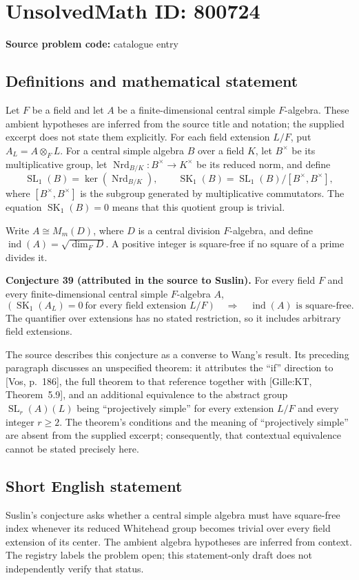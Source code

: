 \documentclass[11pt]{article}
\begin{document}
\section*{UnsolvedMath ID: 800724}
\textbf{Source problem code:} catalogue entry
\subsection{Definitions and mathematical statement}
Let \(F\) be a field and let \(A\) be a finite-dimensional central simple \(F\)-algebra. These ambient hypotheses are inferred from the source title and notation; the supplied excerpt does not state them explicitly. For each field extension \(L/F\), put \(A_L=A\otimes_F L\). For a central simple algebra \(B\) over a field \(K\), let \(B^\times\) be its multiplicative group, let \(\operatorname{Nrd}_{B/K}:B^\times\to K^\times\) be its reduced norm, and define
\[
\operatorname{SL}_1(B)=\ker(\operatorname{Nrd}_{B/K}),\qquad
\operatorname{SK}_1(B)=\operatorname{SL}_1(B)/[B^\times,B^\times],
\]
where \([B^\times,B^\times]\) is the subgroup generated by multiplicative commutators. The equation \(\operatorname{SK}_1(B)=0\) means that this quotient group is trivial.

Write \(A\cong M_m(D)\), where \(D\) is a central division \(F\)-algebra, and define \(\operatorname{ind}(A)=\sqrt{\dim_F D}\). A positive integer is square-free if no square of a prime divides it.

\textbf{Conjecture 39 (attributed in the source to Suslin).} For every field \(F\) and every finite-dimensional central simple \(F\)-algebra \(A\),
\[
\left(\operatorname{SK}_1(A_L)=0\ \text{for every field extension }L/F\right)
\quad\Longrightarrow\quad
\operatorname{ind}(A)\text{ is square-free}.
\]
The quantifier over extensions has no stated restriction, so it includes arbitrary field extensions.

The source describes this conjecture as a converse to Wang's result. Its preceding paragraph discusses an unspecified theorem: it attributes the ``if'' direction to [Vos, p.~186], the full theorem to that reference together with [Gille:KT, Theorem~5.9], and an additional equivalence to the abstract group \(\operatorname{SL}_r(A)(L)\) being ``projectively simple'' for every extension \(L/F\) and every integer \(r\geq 2\). The theorem's conditions and the meaning of ``projectively simple'' are absent from the supplied excerpt; consequently, that contextual equivalence cannot be stated precisely here.
\subsection{Short English statement}
Suslin's conjecture asks whether a central simple algebra must have square-free index whenever its reduced Whitehead group becomes trivial over every field extension of its center. The ambient algebra hypotheses are inferred from context. The registry labels the problem open; this statement-only draft does not independently verify that status.
\end{document}

